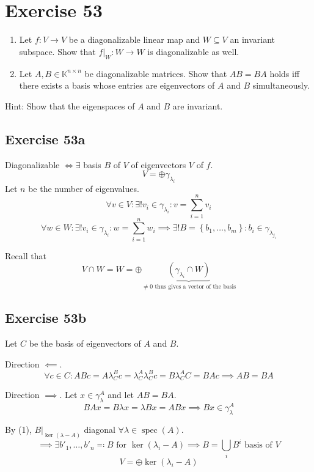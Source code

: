 \documentclass[a4paper]{article}
\theoremstyle{definition}
\newcommand\set[1]{\left\{#1\right\}}
\begin{document}
\section*{Exercise 53}
\begin{ex}
  \begin{enumerate}
    \item Let $f: V \to V$ be a diagonalizable linear map and $W \subseteq V$ an invariant subspace. Show that $f|_W: W \to W$ is diagonalizable as well.
    \item Let $A, B \in \mathbb K^{n \times n}$ be diagonalizable matrices. Show that $AB = BA$ holds iff there exists a basis whose entries are eigenvectors of $A$ and $B$ simultaneously.
  \end{enumerate}
  Hint: Show that the eigenspaces of $A$ and $B$ are invariant.
\end{ex}

\subsection{Exercise 53a}

Diagonalizable $\iff \exists$ basis $B$ of $V$ of eigenvectors $V$ of $f$.
\[ V = \oplus \gamma_{\lambda_i} \]
Let $n$ be the number of eigenvalues.
\[ \forall v \in V: \exists! v_i \in \gamma_{\lambda_i}: v = \sum_{i=1}^n v_i \]
\[ \forall w \in W: \exists! v_i \in \gamma_{\lambda_i}: w = \sum_{i=1}^n w_i \implies \exists! B = \set{b_1, \dots, b_m}: b_i \in \gamma_{\lambda_{j_i}} \]

Recall that
\[ V \cap W = W = \oplus \underbrace{(\gamma_{\lambda_i} \cap W)}_{\neq 0 \text{ thus gives a vector of the basis}} \]

\subsection{Exercise 53b}
Let $C$ be the basis of eigenvectors of $A$ and $B$.

Direction $\impliedby$.
\[ \forall c \in C: ABc = A \lambda^B_C c = \lambda_C^A \lambda_C^B c = B \lambda_C^A C = BA c \implies AB = BA \]

Direction $\implies$.
Let $x \in \gamma_\lambda^A$ and let $AB = BA$.
\[ BA x = B \lambda x = \lambda Bx = ABx \implies Bx \in \gamma_{\lambda}^A \]

By (1), $B|_{\ker(\lambda - A)}$ diagonal $\forall \lambda \in \operatorname{spec}(A)$.
\[ \implies \exists b'_1, \dots, b'_n \eqqcolon B \text{ for } \ker(\lambda_i - A) \implies B = \bigcup_i B^i \text{ basis of } V \]
\[ V = \oplus \ker(\lambda_i - A) \]
\end{document}
